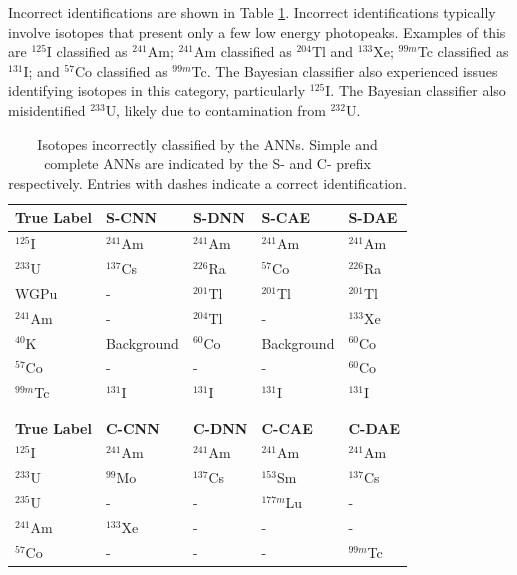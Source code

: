 Incorrect identifications are shown in Table \ref{table:anns_incorrect}. Incorrect identifications typically involve isotopes that present only a few low energy photopeaks. Examples of this are $^{125}$I classified as $^{241}$Am; $^{241}$Am classified as $^{204}$Tl and $^{133}$Xe; $^{99m}$Tc classified as $^{131}$I; and $^{57}$Co classified as $^{99m}$Tc. The Bayesian classifier also experienced issues identifying isotopes in this category, particularly $^{125}$I. The Bayesian classifier also misidentified $^{233}$U, likely due to contamination from $^{232}$U.

\begin{table}[H]
	\centering
	\caption{Isotopes incorrectly classified by the ANNs. Simple and complete ANNs are indicated by the S- and C- prefix respectively. Entries with dashes indicate a correct identification.}
	\label{table:anns_incorrect}
	\begin{tabular}{lllll}
		\hline
		\textbf{True Label} & \textbf{S-CNN} & \textbf{S-DNN} & \textbf{S-CAE} & \textbf{S-DAE} \\ \hline
		$^{125}$I & $^{241}$Am & $^{241}$Am & $^{241}$Am & $^{241}$Am \\ 
		$^{233}$U & $^{137}$Cs & $^{226}$Ra & $^{57}$Co &  $^{226}$Ra  \\ 
		WGPu & - & $^{201}$Tl & $^{201}$Tl & $^{201}$Tl \\ 
		$^{241}$Am & - & $^{204}$Tl &- & $^{133}$Xe \\
		$^{40}$K & Background & $^{60}$Co & Background & $^{60}$Co \\
		$^{57}$Co & - & - & - & $^{60}$Co \\
		$^{99m}$Tc & $^{131}$I & $^{131}$I & $^{131}$I & $^{131}$I \\ \hline \\ \\
		
		\hline
		\textbf{True Label} & \textbf{C-CNN} & \textbf{C-DNN} & \textbf{C-CAE} & \textbf{C-DAE} \\ \hline
		$^{125}$I & $^{241}$Am & $^{241}$Am & $^{241}$Am & $^{241}$Am  \\ 
		$^{233}$U & $^{99}$Mo & $^{137}$Cs & $^{153}$Sm &  $^{137}$Cs \\ 
		$^{235}$U & - & - &  $^{177m}$Lu  & - \\ 
		$^{241}$Am & $^{133}$Xe & - & - & - \\	
		$^{57}$Co & - & - & - & $^{99m}$Tc \\ \hline
	\end{tabular}
\end{table}


